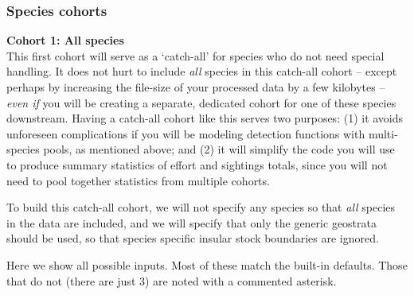 \documentclass[
]{book}
\begin{document}
\hypertarget{species-cohorts}{%
\subsubsection*{Species cohorts}\label{species-cohorts}}

\textbf{Cohort 1: All species}\\
This first cohort will serve as a `catch-all' for species who do not need special handling. It does not hurt to include \emph{all} species in this catch-all cohort -- except perhaps by increasing the file-size of your processed data by a few kilobytes -- \emph{even if} you will be creating a separate, dedicated cohort for one of these species downstream. Having a catch-all cohort like this serves two purposes: (1) it avoids unforeseen complications if you will be modeling detection functions with multi-species pools, as mentioned above; and (2) it will simplify the code you will use to produce summary statistics of effort and sightings totals, since you will not need to pool together statistics from multiple cohorts.

To build this catch-all cohort, we will not specify any species so that \emph{all} species in the data are included, and we will specify that only the generic geostrata should be used, so that species specific insular stock boundaries are ignored.

Here we show all possible inputs. Most of these match the built-in defaults. Those that do not (there are just 3) are noted with a commented asterisk.
\end{document}
